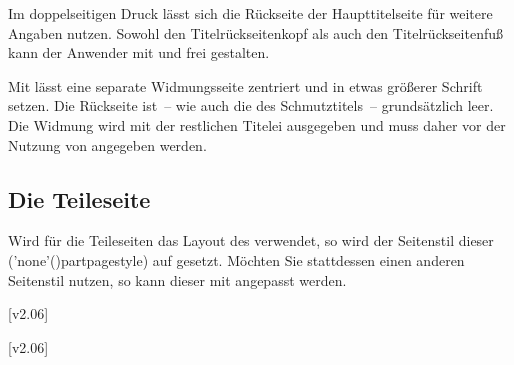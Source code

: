 \begin{DeclareEntity*}{}
\begin{DeclareEntity*}{}
\begin{DeclareEntity*}{}
\begin{Entity}{}
\begin{Declaration}
\begin{Declaration}
\begin{Declaration}
\begin{Declaration}
\begin{Declaration}
\begin{Declaration}
\begin{Declaration}
\begin{Declaration}
%
Im doppelseitigen Druck lässt sich die Rückseite der Haupttitelseite für 
weitere Angaben nutzen. Sowohl den Titelrückseitenkopf als auch den
Titelrückseitenfuß kann der Anwender mit  und 
 frei gestalten.

Mit  lässt eine separate Widmungsseite zentriert und in etwas 
größerer Schrift setzen. Die Rückseite ist~-- wie auch die des Schmutztitels~-- 
grundsätzlich leer. Die Widmung wird mit der restlichen Titelei ausgegeben und 
muss daher vor der Nutzung von  angegeben werden.%
\end{Declaration}
\end{Declaration}
\end{Declaration}
\end{Declaration}
\end{Declaration}
\end{Declaration}
\end{Declaration}
\end{Declaration}
%
\end{Entity}



\subsection{%
  Die Teileseite%
  \label{sec:part}%
}

%
Wird für die Teileseiten das Layout des \CDs verwendet, so wird der Seitenstil 
dieser (\Macro'none'(){partpagestyle}) auf 
 gesetzt. Möchten Sie stattdessen einen anderen 
Seitenstil nutzen, so kann dieser mit 
angepasst werden.

\begin{Declaration}
  {}
  [v2.06]
\begin{Declaration}
  {}
  [v2.06]
\printdeclarationlist[Schriftelemente]


\end{Declaration}
\end{Declaration}
\end{DeclareEntity*}
\end{DeclareEntity*}
\end{DeclareEntity*}
